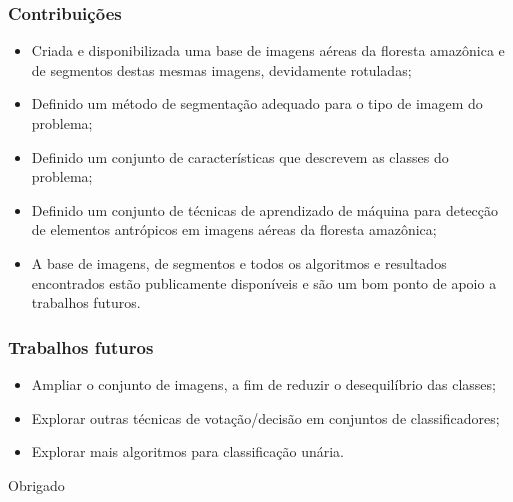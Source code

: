 \documentclass[t]{beamer}
\begin{document}
\begin{frame}[c]
	\frametitle{Contribuições}

	\begin{itemize}
		\item Criada e disponibilizada uma base de imagens aéreas da floresta amazônica e de segmentos destas mesmas imagens, devidamente rotuladas;
		\item Definido um método de segmentação adequado para o tipo de imagem do problema;
		\item Definido um conjunto de características que descrevem as classes do problema;
		\item Definido um conjunto de técnicas de aprendizado de máquina para detecção de elementos antrópicos em imagens aéreas da floresta amazônica;
		\item A base de imagens, de segmentos e todos os algoritmos e resultados encontrados estão publicamente disponíveis e são um bom ponto de apoio a trabalhos futuros.
	\end{itemize}
\end{frame}

\begin{frame}[c]
	\frametitle{Trabalhos futuros}

	\begin{itemize}
		\item Ampliar o conjunto de imagens, a fim de reduzir o desequilíbrio das classes;
		\item Explorar outras técnicas de votação/decisão em conjuntos de classificadores;
		\item Explorar mais algoritmos para classificação unária.
	\end{itemize}
\end{frame}

\begin{frame}[c]
	\centering
	\huge Obrigado
\end{frame}


%	
%	
\end{document}
